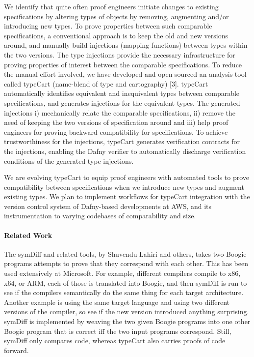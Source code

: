 We identify that quite often proof engineers initiate changes to existing specifications by altering types of objects by removing, augmenting and/or introducing new types. To prove properties between such comparable specifications, a conventional approach is to keep the old and new versions around, and manually build injections (mapping functions) between types within the two versions. The type injections provide the necessary infrastructure for proving properties of interest between the comparable specifications. To reduce the manual effort involved, we have developed and open-sourced an analysis tool called typeCart (name-blend of type and cartography) [3]. typeCart automatically identifies equivalent and inequivalent types between comparable specifications, and generates injections for the equivalent types. The generated injections i) mechanically relate the comparable specifications, ii) remove the need of keeping the two versions of specification around and iii) help proof engineers for proving backward compatibility for specifications. To achieve trustworthiness for the injections, typeCart generates verification contracts for the injections, enabling the Dafny verifier to automatically discharge verification conditions of the generated type injections. 

We are evolving typeCart to equip proof engineers with automated tools to prove compatibility between specifications when we introduce new types and augment existing types. We plan to implement workflows for typeCart integration with the version control system of Dafny-based developments at AWS, and its instrumentation to varying codebases of comparability and size.



\paragraph{Related Work}
The symDiff and related tools, by Shuvendu Lahiri and others, takes two Boogie programs attempts to prove that they correspond with each other. This has been used extensively at Microsoft. For example, different compilers compile to x86, x64, or ARM, each of those is translated into Boogie, and then symDiff is run to see if the compilers semantically do the same thing for each target architecture. Another example is using the same target language and using two different versions of the compiler, so see if the new version introduced anything surprising. symDiff is implemented by weaving the two given Boogie programs into one other Boogie program that is correct iff the two input programs correspond.
Still, symDiff only compares code, whereas typeCart also carries proofs of code forward.
